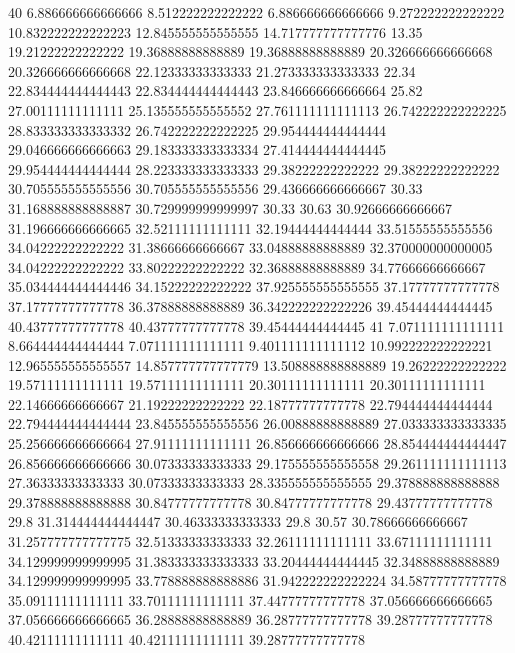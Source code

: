 40 6.886666666666666 8.512222222222222 6.886666666666666 9.272222222222222 10.832222222222223 12.845555555555555 14.717777777777776 13.35 19.21222222222222 19.36888888888889 19.36888888888889 20.326666666666668 20.326666666666668 22.12333333333333 21.273333333333333 22.34 22.834444444444443 22.834444444444443 23.846666666666664 25.82 27.00111111111111 25.135555555555552 27.761111111111113 26.742222222222225 28.833333333333332 26.742222222222225 29.954444444444444 29.046666666666663 29.183333333333334 27.414444444444445 29.954444444444444 28.223333333333333 29.38222222222222 29.38222222222222 30.705555555555556 30.705555555555556 29.436666666666667 30.33 31.168888888888887 30.729999999999997 30.33 30.63 30.92666666666667 31.196666666666665 32.52111111111111 32.19444444444444 33.51555555555556 34.04222222222222 31.38666666666667 33.04888888888889 32.370000000000005 34.04222222222222 33.80222222222222 32.36888888888889 34.77666666666667 35.034444444444446 34.15222222222222 37.925555555555555 37.17777777777778 37.17777777777778 36.37888888888889 36.342222222222226 39.45444444444445 40.43777777777778 40.43777777777778 39.45444444444445
41 7.071111111111111 8.664444444444444 7.071111111111111 9.401111111111112 10.992222222222221 12.965555555555557 14.857777777777779 13.508888888888889 19.26222222222222 19.57111111111111 19.57111111111111 20.30111111111111 20.30111111111111 22.14666666666667 21.19222222222222 22.18777777777778 22.794444444444444 22.794444444444444 23.845555555555556 26.00888888888889 27.033333333333335 25.256666666666664 27.91111111111111 26.856666666666666 28.854444444444447 26.856666666666666 30.07333333333333 29.175555555555558 29.261111111111113 27.36333333333333 30.07333333333333 28.335555555555555 29.378888888888888 29.378888888888888 30.84777777777778 30.84777777777778 29.43777777777778 29.8 31.314444444444447 30.46333333333333 29.8 30.57 30.78666666666667 31.257777777777775 32.51333333333333 32.26111111111111 33.67111111111111 34.129999999999995 31.383333333333333 33.20444444444445 32.34888888888889 34.129999999999995 33.778888888888886 31.942222222222224 34.58777777777778 35.09111111111111 33.70111111111111 37.44777777777778 37.056666666666665 37.056666666666665 36.28888888888889 36.28777777777778 39.28777777777778 40.42111111111111 40.42111111111111 39.28777777777778
